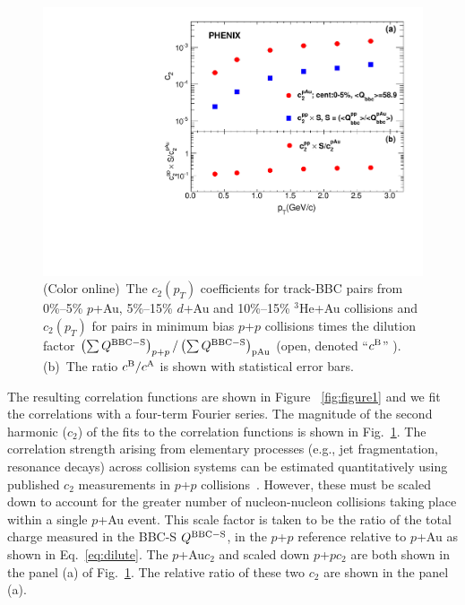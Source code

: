 \documentclass[%
reprint,
showpacs,preprintnumbers,
 amsmath,amssymb,
 aps,
]{revtex4-1}
\newcommand{\pt}{\mbox{$p_T$}\xspace}
\newcommand{\dau}{\mbox{$d$+Au}\xspace}
\newcommand{\pau}{\mbox{$p$+Au}\xspace}
\newcommand{\hau}{\mbox{$^3\text{He}$+Au}\xspace}
\newcommand{\pp}{\mbox{$p$+$p$}\xspace}
\begin{document}
\begin{figure}[htbp]
  \includegraphics[scale=0.45]{Figures/figure2.pdf}
  \caption{(Color online)~The $c_2(p_T)$ coefficients for track-BBC pairs from 
0\%--5\% \pau, 5\%--15\% \dau and 10\%--15\% \hau collisions and
$c_{2}(p_{T})$ for pairs in minimum bias \pp collisions times the dilution
factor $\left( \sum Q^{{\rm BBC-S}} \right)_{p+p} / \left( \sum Q^{{\rm
BBC-S}} \right)_{{\rm pAu}}$ (open, denoted ``$c^{{\rm B}}$'' ). (b)~The
ratio $c^{{\rm B}}/c^{{\rm A}}$ is shown with statistical error bars.
}
\label{fig:figure2}
\end{figure}

The resulting correlation functions are shown in Figure ~\ref{fig:figure1} and we fit the correlations with a four-term Fourier series. The magnitude of the second harmonic ($c_{2}$) of the fits to the correlation functions is shown in Fig.~\ref{fig:figure2}. 
The correlation strength arising from elementary processes (e.g., jet fragmentation, resonance decays) across collision systems can be estimated quantitatively using published $c_{2}$ measurements in \pp collisions~\cite{PhysRevLett.115.142301}. However, these must be scaled down to account for the greater number of nucleon-nucleon collisions taking place within a single \pau event. This scale factor is taken to be the ratio of the total charge measured in the BBC-S $Q^{{\rm BBC-S}}$, in the \pp reference relative to \pau as shown in Eq.~\ref{eq:dilute}. The \pau $c_{2}$ and scaled down \pp $c_{2}$
are both shown in the panel (a) of Fig.~\ref{fig:figure2}. The relative ratio of these two $c_{2}$ are shown in the panel (a).
\end{document}
